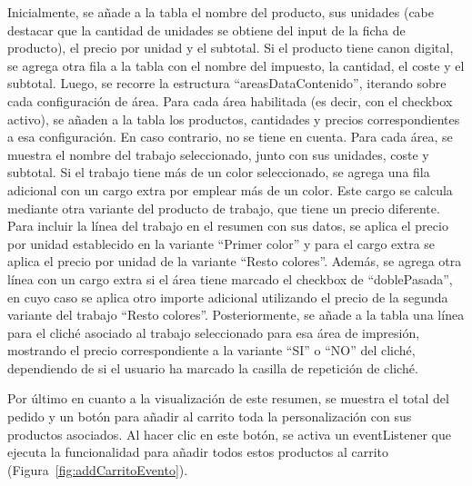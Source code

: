 \documentclass[11pt]{article}
\begin{document}
Inicialmente, se añade a la tabla el nombre del producto, sus unidades (cabe destacar que la cantidad de unidades se obtiene del input de 
la ficha de producto), el precio por unidad y el subtotal. Si el producto tiene canon digital, 
se agrega otra fila a la tabla con el nombre del impuesto, la cantidad, el coste y el subtotal. Luego, se recorre la estructura ``areasDataContenido'', 
iterando sobre cada configuración de área. Para cada área habilitada 
(es decir, con el checkbox activo), se añaden a la tabla los productos, cantidades y precios correspondientes a esa configuración.
En caso contrario, no se tiene en cuenta. Para cada área, se muestra el nombre del trabajo seleccionado, junto con sus unidades, 
coste y subtotal. Si el trabajo tiene más de un color seleccionado, se agrega una fila adicional con un cargo extra por emplear 
más de un color. Este cargo se calcula mediante otra variante del producto de trabajo, que tiene un precio diferente. 
Para incluir la línea del trabajo en el resumen con sus datos, se aplica el precio por unidad establecido en la variante 
``Primer color'' y para el cargo extra se aplica el precio por unidad de la variante ``Resto colores''. Además, 
se agrega otra línea con un cargo extra si el área tiene marcado el checkbox de ``doblePasada'', en cuyo caso se aplica 
otro importe adicional utilizando el precio de la segunda variante del trabajo ``Resto colores''. Posteriormente, se añade a la tabla 
una línea para el cliché asociado al trabajo seleccionado para esa área de impresión, mostrando el precio correspondiente a la 
variante ``SI'' o ``NO'' del cliché, dependiendo de si el usuario ha marcado la casilla de repetición de cliché.

Por último en cuanto a la visualización de este resumen, se muestra el total del pedido y un botón para añadir al carrito toda la personalización 
con sus productos asociados. Al hacer clic en este botón, se activa un eventListener que ejecuta la funcionalidad para añadir todos estos 
productos al carrito (Figura~\ref{fig:addCarritoEvento}). 
\end{document}
